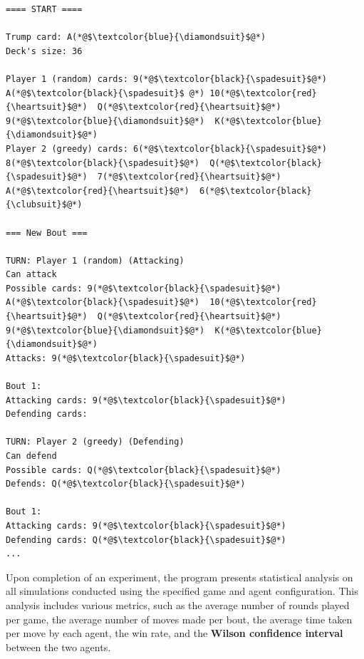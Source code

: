 \begin{lstlisting}[frame=single]
==== START ====

Trump card: A(*@$\textcolor{blue}{\diamondsuit}$@*)
Deck's size: 36

Player 1 (random) cards: 9(*@$\textcolor{black}{\spadesuit}$@*)  A(*@$\textcolor{black}{\spadesuit}$ @*) 10(*@$\textcolor{red}{\heartsuit}$@*)  Q(*@$\textcolor{red}{\heartsuit}$@*)  9(*@$\textcolor{blue}{\diamondsuit}$@*)  K(*@$\textcolor{blue}{\diamondsuit}$@*)
Player 2 (greedy) cards: 6(*@$\textcolor{black}{\spadesuit}$@*)  8(*@$\textcolor{black}{\spadesuit}$@*)  Q(*@$\textcolor{black}{\spadesuit}$@*)  7(*@$\textcolor{red}{\heartsuit}$@*)  A(*@$\textcolor{red}{\heartsuit}$@*)  6(*@$\textcolor{black}{\clubsuit}$@*)

=== New Bout ===

TURN: Player 1 (random) (Attacking)
Can attack
Possible cards: 9(*@$\textcolor{black}{\spadesuit}$@*)  A(*@$\textcolor{black}{\spadesuit}$@*)  10(*@$\textcolor{red}{\heartsuit}$@*)  Q(*@$\textcolor{red}{\heartsuit}$@*)  9(*@$\textcolor{blue}{\diamondsuit}$@*)  K(*@$\textcolor{blue}{\diamondsuit}$@*)
Attacks: 9(*@$\textcolor{black}{\spadesuit}$@*)

Bout 1:
Attacking cards: 9(*@$\textcolor{black}{\spadesuit}$@*)
Defending cards:

TURN: Player 2 (greedy) (Defending)
Can defend
Possible cards: Q(*@$\textcolor{black}{\spadesuit}$@*)
Defends: Q(*@$\textcolor{black}{\spadesuit}$@*)

Bout 1:
Attacking cards: 9(*@$\textcolor{black}{\spadesuit}$@*)
Defending cards: Q(*@$\textcolor{black}{\spadesuit}$@*)
...
\end{lstlisting}

Upon completion of an experiment, the program presents statistical analysis on all simulations conducted using the specified game and agent configuration. This analysis includes various metrics, such as the average number of rounds played per game, the average number of moves made per bout, the average time taken per move by each agent, the win rate, and the \textbf{Wilson confidence interval} between the two agents.

